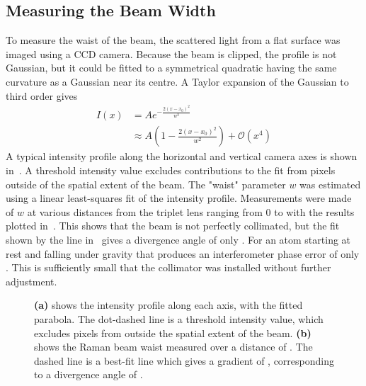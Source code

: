 \subsection{Measuring the Beam Width}
To measure the waist of the beam, the scattered light from a flat surface was imaged
using a CCD camera. Because the beam is clipped, the profile is not
Gaussian, but it could be fitted to a symmetrical quadratic having the
same curvature as a Gaussian near its centre. 
A Taylor expansion of the Gaussian to third order gives
\begin{align}
	I(x) & = A e^{-\frac{2(x-x_0)^2}{ w^2}} \nonumber                                                                              \\
       & \approx A\left(1-\frac{2(x- x_0)^2}{w^2}\right) +
       \mathcal{O}(x^4)
\end{align}
A typical intensity profile along the horizontal and vertical camera axes is
shown in~. A threshold intensity value excludes
contributions to the fit from pixels outside of the spatial extent of
the beam. The "waist" parameter $w$
was estimated using a linear least-squares fit of the intensity
profile. 
Measurements were made of $w$ at various distances from the triplet
lens ranging from 0 to  with the results plotted
in~. This shows that the beam is not
perfectly collimated, but the fit shown by the line
in~ gives a divergence angle of only
. For an atom starting at rest and
falling under gravity that produces an interferometer phase error of
only . This is sufficiently small
that the collimator was installed without further adjustment. 
\begin{figure} 
  \centering
	\def\svgwidth{\columnwidth}
	\caption[Raman beam intensity profile and beam waist.]{ \textbf{(a)} shows the intensity profile along
		each axis, with the fitted parabola. The dot-dashed line is a threshold
		intensity value, which excludes pixels from outside the spatial extent of
    the beam. \textbf{(b)} shows the Raman beam waist measured over a distance
		of .
		The dashed line is a best-fit line which gives a gradient of
  , corresponding to a divergence
angle of .} 
  \label{fig:beam_waist_plots} 
\end{figure}
